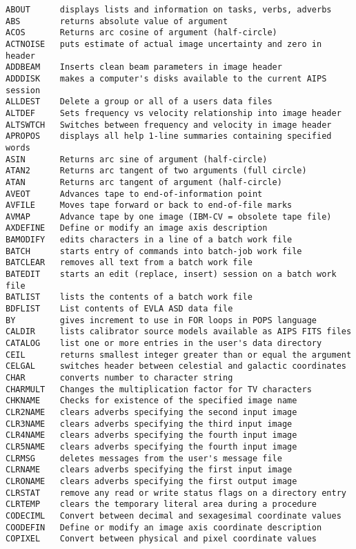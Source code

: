\begin{verbatim}
ABOUT      displays lists and information on tasks, verbs, adverbs
ABS        returns absolute value of argument
ACOS       Returns arc cosine of argument (half-circle)
ACTNOISE   puts estimate of actual image uncertainty and zero in header
ADDBEAM    Inserts clean beam parameters in image header
ADDDISK    makes a computer's disks available to the current AIPS session
ALLDEST    Delete a group or all of a users data files
ALTDEF     Sets frequency vs velocity relationship into image header
ALTSWTCH   Switches between frequency and velocity in image header
APROPOS    displays all help 1-line summaries containing specified words
ASIN       Returns arc sine of argument (half-circle)
ATAN2      Returns arc tangent of two arguments (full circle)
ATAN       Returns arc tangent of argument (half-circle)
AVEOT      Advances tape to end-of-information point
AVFILE     Moves tape forward or back to end-of-file marks
AVMAP      Advance tape by one image (IBM-CV = obsolete tape file)
AXDEFINE   Define or modify an image axis description
BAMODIFY   edits characters in a line of a batch work file
BATCH      starts entry of commands into batch-job work file
BATCLEAR   removes all text from a batch work file
BATEDIT    starts an edit (replace, insert) session on a batch work file
BATLIST    lists the contents of a batch work file
BDFLIST    List contents of EVLA ASD data file
BY         gives increment to use in FOR loops in POPS language
CALDIR     lists calibrator source models available as AIPS FITS files
CATALOG    list one or more entries in the user's data directory
CEIL       returns smallest integer greater than or equal the argument
CELGAL     switches header between celestial and galactic coordinates
CHAR       converts number to character string
CHARMULT   Changes the multiplication factor for TV characters
CHKNAME    Checks for existence of the specified image name
CLR2NAME   clears adverbs specifying the second input image
CLR3NAME   clears adverbs specifying the third input image
CLR4NAME   clears adverbs specifying the fourth input image
CLR5NAME   clears adverbs specifying the fourth input image
CLRMSG     deletes messages from the user's message file
CLRNAME    clears adverbs specifying the first input image
CLRONAME   clears adverbs specifying the first output image
CLRSTAT    remove any read or write status flags on a directory entry
CLRTEMP    clears the temporary literal area during a procedure
CODECIML   Convert between decimal and sexagesimal coordinate values
COODEFIN   Define or modify an image axis coordinate description
COPIXEL    Convert between physical and pixel coordinate values

\end{verbatim}
